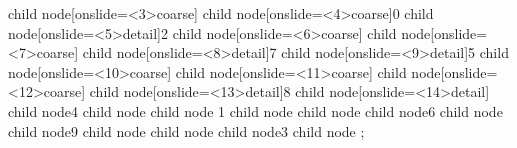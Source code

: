 child { node[onslide=<3>{coarse}]{} %
	child { node[onslide=<4>{coarse}]{0} } %
	child { node[onslide=<5>{detail}]{2} } %
	child { node[onslide=<6>{coarse}]{} %
		child { node[onslide=<7>{coarse}]{} } %
		child { node[onslide=<8>{detail}]{7} } %
		child { node[onslide=<9>{detail}]{5} } %
		child { node[onslide=<10>{coarse}]{} } } %
	child { node[onslide=<11>{coarse}]{} } } %
child { node[onslide=<12>{coarse}]{} }%
child { node[onslide=<13>{detail}]{8} }%
child { node[onslide=<14>{detail}]{} %
	child { node{4} } %
	child { node{} %
		child { node {1} } %
		child { node {} } %
		child { node {} %
			child { node{6} } %
			child { node{} } %
			child { node{9} } %
			child { node{} } %
		}
		child { node {} } }%
	child { node{3} } %
	child{ node{} } }; %
